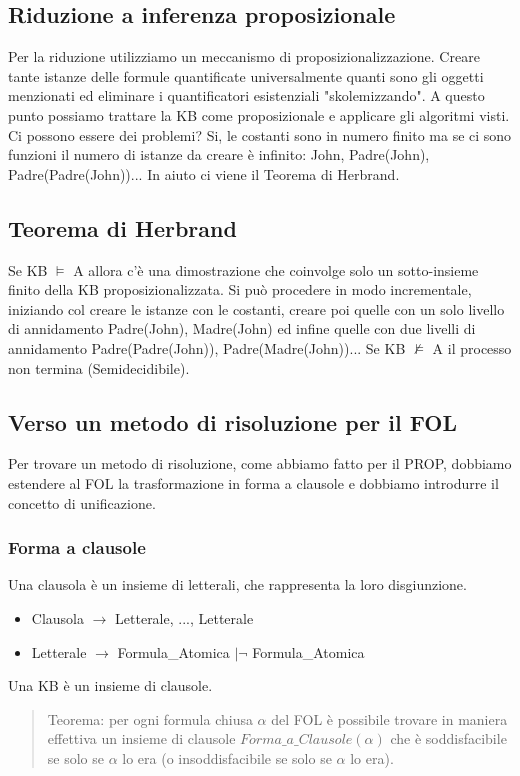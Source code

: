 \documentclass{article}
\begin{document}
\subsection{Riduzione a inferenza proposizionale}
Per la riduzione utilizziamo un meccanismo di proposizionalizzazione. Creare tante istanze delle formule quantificate universalmente quanti sono gli oggetti menzionati ed eliminare i quantificatori esistenziali "skolemizzando". A questo punto possiamo trattare la KB come proposizionale e applicare gli algoritmi visti. Ci possono essere dei problemi? Si, le costanti sono in numero finito ma se ci sono funzioni il numero di istanze da creare è infinito: John, Padre(John), Padre(Padre(John))... In aiuto ci viene il Teorema di Herbrand.

\subsection{Teorema di Herbrand} 
Se KB $\models$ A allora c'è una dimostrazione che coinvolge solo un sotto-insieme finito della KB proposizionalizzata. Si può procedere in modo incrementale, iniziando col creare le istanze con le costanti, creare poi quelle con un solo livello di annidamento Padre(John), Madre(John) ed infine quelle con due livelli di annidamento Padre(Padre(John)), Padre(Madre(John))... Se KB $\nvDash$ A il processo non termina (Semidecidibile).

\subsection{Verso un metodo di risoluzione per il FOL}
Per trovare un metodo di risoluzione, come abbiamo fatto per il PROP, dobbiamo estendere al FOL la trasformazione in forma a clausole e dobbiamo introdurre il concetto di unificazione.

\subsubsection{Forma a clausole}
Una clausola è un insieme di letterali, che rappresenta la loro disgiunzione.
\begin{itemize}
    \item Clausola $\rightarrow$ {Letterale, ..., Letterale}
    \item Letterale $\rightarrow$ Formula\_Atomica $| \neg$ Formula\_Atomica
\end{itemize}
Una KB è un insieme di clausole.
\begin{quote}
    Teorema: per ogni formula chiusa $\alpha$ del FOL è possibile trovare in maniera effettiva un insieme di clausole $Forma\_a\_Clausole(\alpha)$ che è soddisfacibile se solo se $\alpha$ lo era (o insoddisfacibile se solo se $\alpha$ lo era).
\end{quote}
\clearpage
\end{document}
